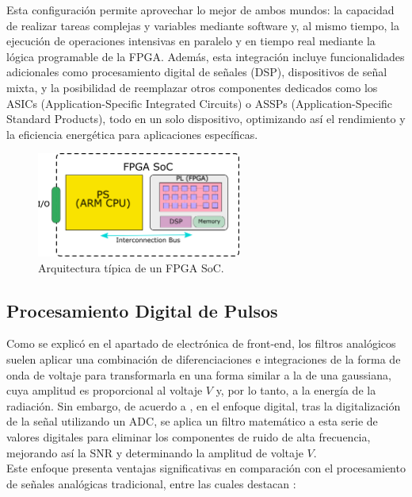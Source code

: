 \documentclass[]{book}
\begin{document}
\noindent Esta configuración permite aprovechar lo mejor de ambos mundos: la capacidad de realizar tareas complejas y variables mediante software y, al mismo tiempo, la ejecución de operaciones intensivas en paralelo y en tiempo real mediante la lógica programable de la FPGA. Además, esta integración incluye funcionalidades adicionales como procesamiento digital de señales (DSP), dispositivos de señal mixta, y la posibilidad de reemplazar otros componentes dedicados como los ASICs (Application-Specific Integrated Circuits) o ASSPs (Application-Specific Standard Products), todo en un solo dispositivo, optimizando así el rendimiento y la eficiencia energética para aplicaciones específicas.\\

\begin{figure}[h]
    \centering
    \includegraphics[width=0.6\textwidth]{FPGA_SoC.png}
    \caption{Arquitectura típica de un FPGA SoC.}
    \label{fig:fpga_soc}

\end{figure}

\subsection{Procesamiento Digital de Pulsos}
 
\noindent Como se explicó en el apartado de electrónica de front-end, los filtros analógicos suelen aplicar una combinación de diferenciaciones e integraciones de la forma de onda de voltaje para transformarla en una forma similar a la de una gaussiana, cuya amplitud es proporcional al voltaje $V$ y, por lo tanto, a la energía de la radiación. Sin embargo, de acuerdo a \cite{loudenuclearspectroscopy}, en el enfoque digital, tras la digitalización de la señal utilizando un ADC, se aplica un filtro matemático a esta serie de valores digitales para eliminar los componentes de ruido de alta frecuencia, mejorando así la SNR y determinando la amplitud de voltaje $V$.\\

\noindent Este enfoque presenta ventajas significativas en comparación con el procesamiento de señales analógicas tradicional, entre las cuales destacan \cite{radeka1968optimum}:
\end{document}
